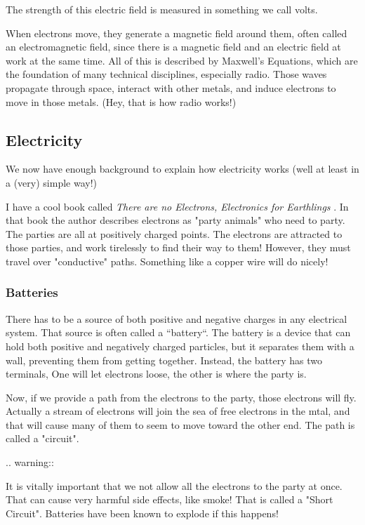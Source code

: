 The strength of this electric field is measured in something we call volts.

When electrons move, they generate a magnetic field around them, often called
an electromagnetic field, since there is a magnetic field and an electric
field at work at the same time. All of this is described by Maxwell's
Equations, which are the foundation of many technical disciplines, especially
radio. Those waves propagate through space, interact with other metals, and
induce electrons to move in those metals. (Hey, that is how radio works!)

\subsection{Electricity}

We now have enough background to explain how electricity works (well at least
in a (very) simple way!)

I have a cool book called \emph{There are no Electrons, Electronics for Earthlings} \cite{Amdahl:1991}. In
that book the author describes electrons as "party animals" who need to party.
The parties are all at positively charged points. The electrons are attracted to
those parties, and work tirelessly to find their way to them! However, they
must travel over "conductive" paths. Something like a copper wire will do
nicely!

\subsubsection{Batteries}

There has to be a source of both positive and negative charges in any
electrical system. That source is often called a ``battery``. The battery is a
device that can hold both positive and negatively charged particles, but it
separates them with a wall, preventing them from getting together. Instead, the
battery has two terminals, One will let electrons loose, the other is where the
party is.

Now, if we provide a path from the electrons to the party, those electrons will
fly. Actually a stream of electrons will join the sea of free electrons in the
mtal, and that will cause many of them to seem to move toward the other end.
The path is called a "circuit".

..  warning::

    It is vitally important that we not allow all the electrons to the party at
    once. That can cause very harmful side effects, like smoke! That is called
    a "Short Circuit". Batteries have been known to explode if this happens!

